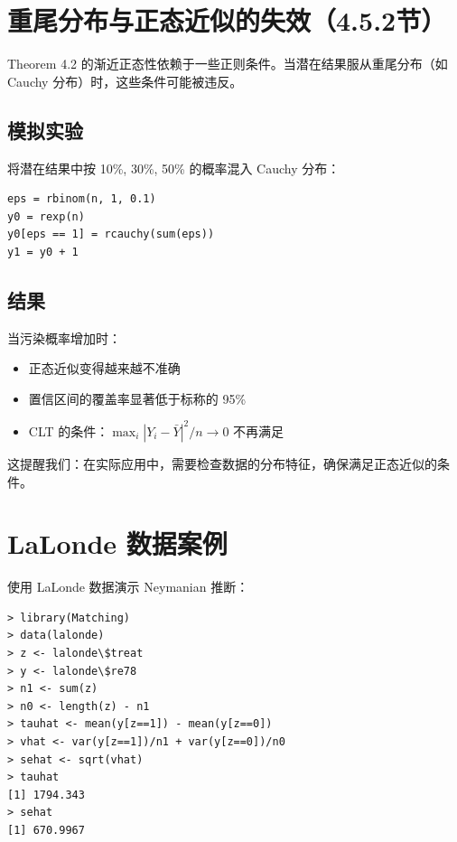 \section{重尾分布与正态近似的失效（4.5.2节）}

Theorem 4.2 的渐近正态性依赖于一些正则条件。当潜在结果服从重尾分布（如 Cauchy 分布）时，这些条件可能被违反。

\subsection{模拟实验}

将潜在结果中按 10\%, 30\%, 50\% 的概率混入 Cauchy 分布：

\begin{verbatim}
eps = rbinom(n, 1, 0.1)
y0 = rexp(n)
y0[eps == 1] = rcauchy(sum(eps))
y1 = y0 + 1
\end{verbatim}

\subsection{结果}

当污染概率增加时：
\begin{itemize}
  \item 正态近似变得越来越不准确
  \item 置信区间的覆盖率显著低于标称的 95\%
  \item CLT 的条件：$\max_i |Y_i - \bar{Y}|^2 / n \to 0$ 不再满足
\end{itemize}

这提醒我们：在实际应用中，需要检查数据的分布特征，确保满足正态近似的条件。


\section{LaLonde 数据案例}

使用 LaLonde 数据演示 Neymanian 推断：

\begin{verbatim}
> library(Matching)
> data(lalonde)
> z <- lalonde\$treat
> y <- lalonde\$re78
> n1 <- sum(z)
> n0 <- length(z) - n1
> tauhat <- mean(y[z==1]) - mean(y[z==0])
> vhat <- var(y[z==1])/n1 + var(y[z==0])/n0
> sehat <- sqrt(vhat)
> tauhat
[1] 1794.343
> sehat
[1] 670.9967
\end{verbatim}

